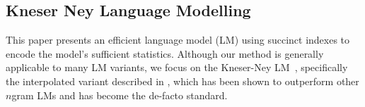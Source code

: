 
\subsection{Kneser Ney Language Modelling}
\label{sec-lm}


This paper presents an efficient \ngram language model (LM) using succinct indexes to encode the model's sufficient statistics. %
Although our method is generally applicable to many LM variants, we focus on the Kneser-Ney LM~\cite{kneser1995improved}, specifically the interpolated variant described in , which has been shown to outperform other $n$gram LMs and has become the de-facto standard.

